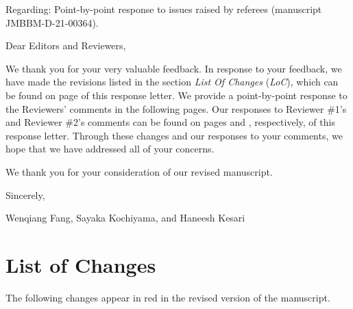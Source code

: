 \documentclass[11pt,letterpaper]{report}
\begin{document}
\newpage
\setcounter{page}{1}
\thispagestyle{fancy}
\phantom{x}
\vspace{4em}

Regarding: Point-by-point response to issues raised by referees  (manuscript JMBBM-D-21-00364).

\vspace{3em}
Dear Editors and Reviewers,
\vspace{1em}

We thank you for your very valuable feedback. In response to your feedback, we have made the revisions listed in the section \textit{List Of Changes} (\textit{LoC}), which can be found on  page \pageref{LoCpage} of this response letter. We  provide a point-by-point response to the Reviewers' comments in the following pages. Our responses to Reviewer \#1's and Reviewer \#2's comments can be found on pages \pageref{rev1} and \pageref{rev2}, respectively, of this response letter. Through these changes and our responses to your comments, we hope that we have addressed all of your concerns.

We thank you for your consideration of our revised manuscript.

\vspace{2em}
Sincerely,

Wenqiang Fang, Sayaka Kochiyama, and Haneesh Kesari

\clearpage
\pagestyle{plain}
\section*{List of Changes}
\label{LoCpage}
The following changes  appear in red in the revised version of the manuscript.
\end{document}
